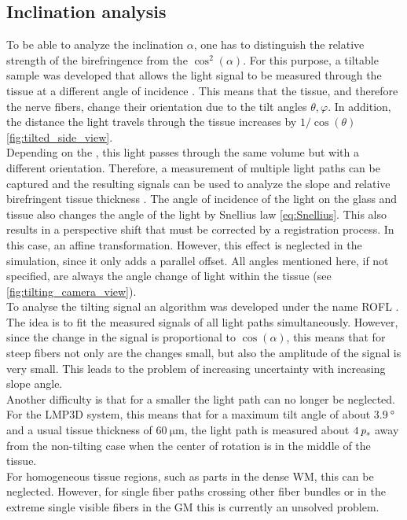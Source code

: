 \subsection{Inclination analysis} \label{sec::InclAnalysis}
%
To be able to analyze the inclination $\alpha$, one has to distinguish the relative strength of the birefringence from the $\cos^2(\alpha)$.
For this purpose, a tiltable sample was developed that allows the light signal to be measured through the tissue at a different angle of incidence \cite{Axer2011}.
This means that the tissue, and therefore the nerve fibers, change their orientation due to the tilt angles $\theta, \varphi$.
In addition, the distance the light travels through the tissue increases by $1/\cos(\theta)$ \cref{fig:tilted_side_view}.
\\
%
Depending on the \pixelsize{}, this light passes through the same volume but with a different orientation.
Therefore, a measurement of multiple light paths can be captured and the resulting signals can be used to analyze the slope and relative birefringent tissue thickness \trel{}.
The angle of incidence of the light on the glass and tissue also changes the angle of the light by Snellius law \cref{eq:Snellius}.
This also results in a perspective shift that must be corrected by a registration process.
In this case, an affine transformation.
However, this effect is neglected in the simulation, since it only adds a parallel offset.
All angles mentioned here, if not specified, are always the angle change of light within the tissue (see \cref{fig:tilting_camera_view}).
\\
%
To analyse the tilting signal an algorithm was developed under the name \ac{ROFL} \cite{Wiese:887678,Schmitz2018}.
The idea is to fit the measured signals of all light paths simultaneously.
However, since the change in the signal is proportional to $\cos(\alpha)$, this means that for steep fibers not only are the changes small, but also the amplitude of the signal is very small.
This leads to the problem of increasing uncertainty with increasing slope angle.
\\
%
Another difficulty is that for a smaller \pixelsize{} the light path can no longer be neglected.
For the \ac{LMP3D} system, this means that for a maximum tilt angle of about $\SI{3.9}{\degree}$ and a usual tissue thickness of $\SI{60}{\micro\meter}$, the light path is measured about $\SI{4}{\textnormal{$\mathit{p_{s}}$}}$ away from the non-tilting case when the center of rotation is in the middle of the tissue.
\\
%
For homogeneous tissue regions, such as parts in the dense \ac{WM}, this can be neglected.
However, for single fiber paths crossing other fiber bundles or in the extreme single visible fibers in the \ac{GM} this is currently an unsolved problem.
%
%
%
